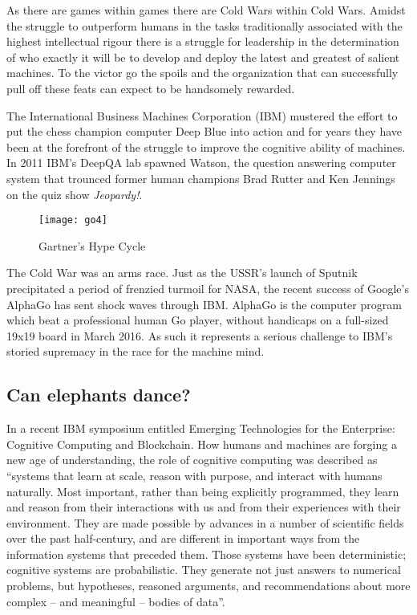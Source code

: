 As there are games within games there are Cold Wars within Cold Wars. Amidst the struggle to outperform humans in the tasks traditionally associated with the highest intellectual rigour there is a struggle for leadership in the determination of who exactly it will be to develop and deploy the latest and greatest of salient machines. To the victor go the spoils and the organization that can successfully pull off these feats can expect to be handsomely rewarded.

The International Business Machines Corporation (IBM) mustered the effort to put the chess champion computer Deep Blue into action and for years they have been at the forefront of the struggle to improve the cognitive ability of machines. 
In 2011 IBM's DeepQA lab spawned Watson, the question answering computer system that trounced former human champions Brad Rutter and Ken Jennings on the quiz show \textit{Jeopardy!}.

\begin{figure}
  \centering
    \texttt{[image: go4]}
  \caption{Gartner's Hype Cycle}
\end{figure}


The Cold War was an arms race. Just as the USSR's launch of Sputnik precipitated a period of frenzied turmoil for NASA, the recent success of Google's AlphaGo has sent shock waves through IBM. AlphaGo is the computer program which beat a professional human Go player, without handicaps on a full-sized 19x19 board in March 2016. As such it represents a serious challenge to IBM's storied supremacy in the race for the machine mind.

\subsection*{Can elephants dance?}

In a recent IBM symposium entitled Emerging Technologies for the Enterprise: Cognitive Computing and Blockchain. How humans and machines are forging a new age of understanding, the role of cognitive computing was described as ``systems that learn at scale, reason with purpose, and interact with humans naturally. Most important, rather than being explicitly programmed, they learn and reason from their interactions with us and from their experiences with their environment. They are made possible by advances in a number of scientific fields over the past half-century, and are different in important ways from the information systems that preceded them. Those systems have been deterministic; cognitive systems are probabilistic. They generate not just answers to numerical problems, but hypotheses, reasoned arguments, and recommendations about more complex -- and meaningful -- bodies of data''.

